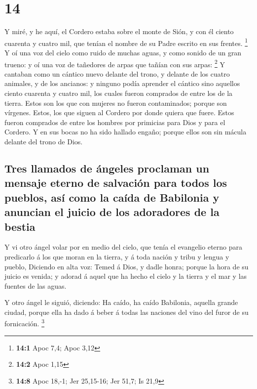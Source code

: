 \hypertarget{section-13}{%
\section{14}\label{section-13}}

 Y miré, y he aquí, el Cordero estaba sobre el monte de
Sión, y con él ciento cuarenta y cuatro mil, que tenían el nombre de su
Padre escrito en sus frentes. \footnote{\textbf{14:1} Apoc 7,4; Apoc
  3,12}  Y oí una voz del cielo como ruido de muchas
aguas, y como sonido de un gran trueno: y oí una voz de tañedores de
arpas que tañían con sus arpas: \footnote{\textbf{14:2} Apoc 1,15}
 Y cantaban como un cántico nuevo delante del trono, y
delante de los cuatro animales, y de los ancianos: y ninguno podía
aprender el cántico sino aquellos ciento cuarenta y cuatro mil, los
cuales fueron comprados de entre los de la tierra.  Estos
son los que con mujeres no fueron contaminados; porque son vírgenes.
Estos, los que siguen al Cordero por donde quiera que fuere. Estos
fueron comprados de entre los hombres por primicias para Dios y para el
Cordero.  Y en sus bocas no ha sido hallado engaño; porque
ellos son sin mácula delante del trono de Dios.

\hypertarget{tres-llamados-de-uxe1ngeles-proclaman-un-mensaje-eterno-de-salvaciuxf3n-para-todos-los-pueblos-asuxed-como-la-cauxedda-de-babilonia-y-anuncian-el-juicio-de-los-adoradores-de-la-bestia}{%
\subsection{Tres llamados de ángeles proclaman un mensaje eterno de
salvación para todos los pueblos, así como la caída de Babilonia y
anuncian el juicio de los adoradores de la
bestia}\label{tres-llamados-de-uxe1ngeles-proclaman-un-mensaje-eterno-de-salvaciuxf3n-para-todos-los-pueblos-asuxed-como-la-cauxedda-de-babilonia-y-anuncian-el-juicio-de-los-adoradores-de-la-bestia}}

 Y vi otro ángel volar por en medio del cielo, que tenía
el evangelio eterno para predicarlo á los que moran en la tierra, y á
toda nación y tribu y lengua y pueblo,  Diciendo en alta
voz: Temed á Dios, y dadle honra; porque la hora de su juicio es venida;
y adorad á aquel que ha hecho el cielo y la tierra y el mar y las
fuentes de las aguas.

 Y otro ángel le siguió, diciendo: Ha caído, ha caído
Babilonia, aquella grande ciudad, porque ella ha dado á beber á todas
las naciones del vino del furor de su fornicación. \footnote{\textbf{14:8}
  Apoc 18,-1; Jer 25,15-16; Jer 51,7; Is 21,9}

